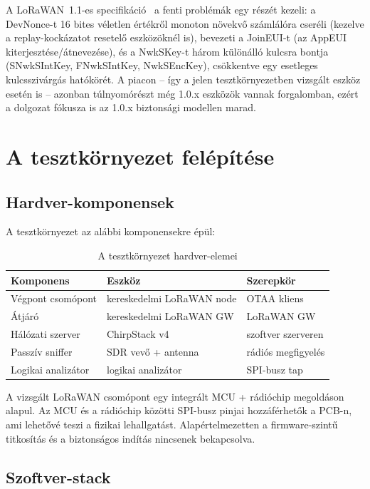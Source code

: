 \documentclass[12pt,a4paper]{article}
\begin{document}
A LoRaWAN~1.1-es specifikáció~\cite{lorawan11} a fenti problémák egy részét
kezeli: a DevNonce-t 16 bites véletlen értékről monoton növekvő számlálóra
cseréli (kezelve a replay-kockázatot resetelő eszközöknél is), bevezeti a
JoinEUI-t (az AppEUI kiterjesztése/átnevezése), és a NwkSKey-t három
különálló kulcsra bontja (SNwkSIntKey, FNwkSIntKey, NwkSEncKey), csökkentve
egy esetleges kulcsszivárgás hatókörét. A piacon -- így a jelen
tesztkörnyezetben vizsgált eszköz esetén is -- azonban túlnyomórészt még
1.0.x eszközök vannak forgalomban, ezért a dolgozat fókusza is az 1.0.x
biztonsági modellen marad.

\section{A tesztkörnyezet felépítése}

\subsection{Hardver-komponensek}

A tesztkörnyezet az alábbi komponensekre épül:

\begin{table}[H]
\centering
\caption{A tesztkörnyezet hardver-elemei}
\begin{tabular}{lll}
\toprule
Komponens & Eszköz & Szerepkör \\
\midrule
Végpont csomópont & kereskedelmi LoRaWAN node & OTAA kliens \\
Átjáró & kereskedelmi LoRaWAN GW & LoRaWAN GW \\
Hálózati szerver & ChirpStack v4 & szoftver szerveren \\
Passzív sniffer & SDR vevő + antenna & rádiós megfigyelés \\
Logikai analizátor & logikai analizátor & SPI-busz tap \\
\bottomrule
\end{tabular}
\end{table}

A vizsgált LoRaWAN csomópont egy integrált MCU + rádióchip megoldáson alapul.
Az MCU és a rádióchip közötti SPI-busz pinjai hozzáférhetők a PCB-n,
ami lehetővé teszi a fizikai lehallgatást.
Alapértelmezetten a firmware-szintű titkosítás és a biztonságos indítás
nincsenek bekapcsolva.

\subsection{Szoftver-stack}
\end{document}
